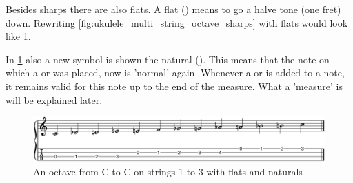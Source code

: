 \newpage

Besides sharps there are also flats. A flat (\flat) means to go a halve tone (one fret) down. Rewriting \ref{fig:ukulele_multi_string_octave_sharps} with flats would look like \ref{fig:ukulele_fretboard_filled_flats}.

In \ref{fig:ukulele_fretboard_filled_flats} also a new symbol is shown the natural (\natural). This means that the note on which a \flat or \sharp was placed, now is 'normal' again. Whenever a \flat or \sharp is added to a note, it remains valid for this note up to the end of the measure. What a 'measure' is will be explained later.

\begin{figure}[h]
    \centering
    \includegraphics[width=\textwidth]{../../MuseScore/Ukulele/UkuleleChromaticNotesFlatsMultiString.png}
    \caption{An octave from C to C on strings 1 to 3 with flats and naturals}
    \label{fig:ukulele_fretboard_filled_flats}
\end{figure}